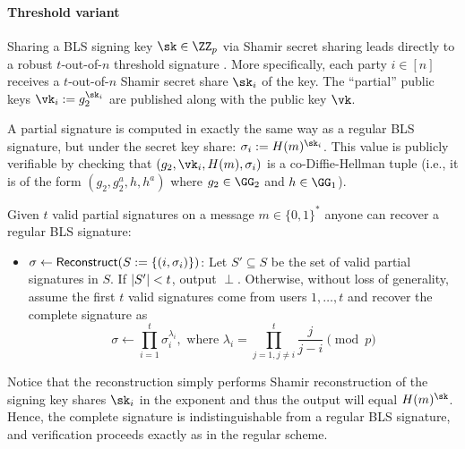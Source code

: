 \paragraph{Threshold variant}
Sharing a BLS signing key $\sk \in \ZZ_p$ via Shamir secret sharing leads directly to a robust $t$-out-of-$n$ threshold signature \cite{AC:BonLynSha01}.
More specifically, each party $i \in [n]$ receives a $t$-out-of-$n$ Shamir secret share $\sk_i$ of the key. The ``partial'' public keys $\vk_i := g_2^{\sk_i}$ are published along with the public key $\vk$.

A partial signature is computed in exactly the same way as a regular BLS signature, but under the secret key share: $\sigma_i := \blshash(m)^{\sk_i}$. This value is publicly verifiable by checking that $(g_2, \vk_i, \blshash(m), \sigma_i)$ is a co-Diffie-Hellman tuple (i.e., it is of the form $(g_2, g_2^a, h, h^a)$ where $g_2 \in \GG_2$ and $h \in \GG_1$).

Given $t$ valid partial signatures on a message $m \in \{0,1\}^*$ anyone can recover a regular BLS signature:

\begin{itemize}
    \item \underline{$\sigma \gets \mathsf{Reconstruct}(S := \{(i, \sigma_i)\})$}: Let $S' \subseteq S$ be the set of valid partial signatures in $S$. If $\lvert S' \rvert < t$, output $\perp$. Otherwise, without loss of generality, assume the first $t$ valid signatures come from users $1, \dots, t$ and recover the complete signature as
    \[
        \sigma \gets \prod_{i=1}^t \sigma_i^{\lambda_i}, \text{ where } \lambda_i = \prod_{j=1,j\neq i}^t \frac{j}{j-i} \pmod{p}
    \]
\end{itemize}

Notice that the reconstruction simply performs Shamir reconstruction of the signing key shares $\sk_i$ in the exponent and thus the output will equal $\blshash(m)^{\sk}$. Hence, the complete signature is indistinguishable from a regular BLS signature, and verification proceeds exactly as in the regular scheme.


